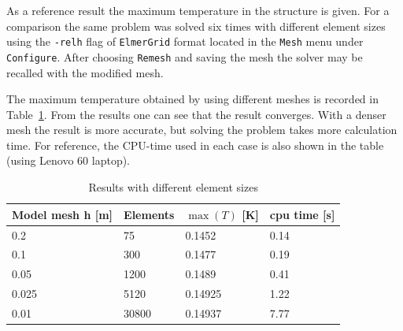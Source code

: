 As a reference result the maximum temperature in the structure is given. For a
comparison the same problem was solved six times with different
element sizes using the \texttt{-relh} flag of \texttt{ElmerGrid} format located in the
\texttt{Mesh} menu under \texttt{Configure}. After choosing \texttt{Remesh} and saving the mesh 
the solver may be recalled with the modified mesh.

The maximum temperature obtained by using different
meshes is recorded in Table~\ref{tb:res1}.  From the results one
can see that the result converges. With a denser mesh the result is
more accurate, but solving the problem takes more calculation time.
For reference, the CPU-time used in each case is
also shown in the table (using Lenovo 60 laptop).

\begin{table}[h]
\caption{Results with different element sizes}
\label{tb:res1}
\begin{center}
\begin{tabular}{llll} \hline
Model mesh h [m] & Elements & $\max (T)$ [K] & cpu time [s]\\ \hline
0.2 & 75 &  0.1452  & 0.14 \\
0.1 &  300 & 0.1477  & 0.19 \\
0.05 & 1200 & 0.1489  & 0.41 \\ 
0.025 & 5120 & 0.14925 & 1.22 \\ 
0.01  & 30800 & 0.14937 & 7.77 \\ \hline
\end{tabular}
\end{center}
\end{table}

\hfill
\mbox{}






